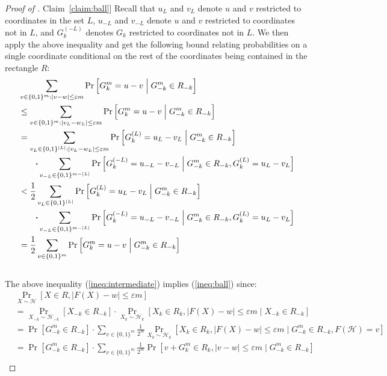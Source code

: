 \documentclass[11pt]{article}
\numberwithin{equation}{section}
\theoremstyle{definition}
\theoremstyle{plain}
\newcommand{\expref}[2]{\hyperref[#2]{#1~\ref{#2}}}
\newcommand{\Cond}{\;\Big|\;}
\newcommand{\follows}{\ensuremath{\sim}}
\newcommand{\zo}{\ensuremath{ \{ 0, 1 \} }}
\newcommand{\gap}{\ensuremath{\varepsilon}}
\begin{document}
\begin{proof}[Proof of \expref{Claim}{claim:ball}]
        Recall that $u_L$ and $v_L$ denote $u$ and $v$ restricted to coordinates in the set $L$, $u_{-L}$ and $v_{-L}$ denote $u$ and $v$ restricted to coordinates not in $L$, and $G_k^{(-L)}$ denotes $G_k$ restricted to coordinates not in $L$. We then apply the above inequality and get the following bound relating probabilities on a single coordinate conditional on the rest of the coordinates being contained in the rectangle $R$:
		\begin{align}
			& \sum_{v\in\zo^m: \left|v-w\right| \le  \gap m }\Pr\left[ G^m_k = u-v \Cond G^m_{-k}\in R_{-k}  \right] \notag\\
			&\le  \sum_{v\in\zo^m: \left|v_L-w_L\right| \le  \gap m }\Pr\left[ G^m_k = u-v \Cond G^m_{-k}\in R_{-k}  \right] \notag\\
			&=  \sum_{v_L\in\zo^{|L|}: \left|v_L-w_L\right| \le  \gap m }\Pr\left[ G^{(L)}_k = u_L-v_L \Cond G^m_{-k}\in R_{-k}  \right] \notag\\
			& \qquad {\Large\boldsymbol{\cdot}} \sum_{v_{-L}\in \zo^{m-|L|}} \Pr\left[ G^{(-L)}_k = u_{-L}-v_{-L} \Cond G^m_{-k}\in R_{-k},G^{(L)}_k = u_L-v_L  \right]  \notag\\
			&<  \frac{1}{2} \sum_{v_L\in\zo^{|L|} }\Pr\left[ G^{(L)}_k = u_L-v_L \Cond G^m_{-k}\in R_{-k}  \right] \notag\\
			& \qquad {\Large\boldsymbol{\cdot}} \sum_{v_{-L}\in \zo^{m-|L|}} \Pr\left[ G^{(-L)}_k = u_{-L}-v_{-L} \Cond G^m_{-k}\in R_{-k},G^{(L)}_k = u_L-v_L  \right]  \notag\\
			&= \frac{1}{2} \sum_{v\in\zo^{m} }\Pr\left[ G^{m}_k = u-v \Cond G^m_{-k}\in R_{-k}  \right] \label{ineq:intermediate}
		\end{align}
		\\
		The above inequality (\ref{ineq:intermediate}) implies (\ref{ineq:ball}) since:
		\begin{align*}
			 & \Pr_{X\follows \mathcal{H}}\left[ X\in R, \left|F(X)-w\right|\le \gap m \right] \\
			&= \Pr_{X_{-k}\follows \mathcal{H}_{-k}}\left[ X_{-k}\in R_{-k} \right]
			\cdot \Pr_{X_k\follows \mathcal{H}_k}\left[ X_k\in R_k, \left|F(X)-w\right|\le \gap m \Cond X_{-k}\in R_{-k}  \right]\\
			&= \Pr\left[ G^m_{-k}\in R_{-k} \right]
			\cdot \sum_{v\in\zo^m}\frac{1}{2^m}\Pr_{X_k\follows \mathcal{H}_k}\left[ X_k\in R_k, \left|F(X)-w\right|\le \gap m \Cond G^m_{-k}\in R_{-k},F(\mathcal{H})=v  \right]\\
			&= \Pr\left[ G^m_{-k}\in R_{-k} \right]
			\cdot \sum_{v\in\zo^m}\frac{1}{2^m}\Pr\left[ v+ G^m_k\in R_k, \left|v-w\right|\le \gap m \Cond G^m_{-k}\in R_{-k}  \right]\\

\end{align*}
\end{proof}
\end{document}
